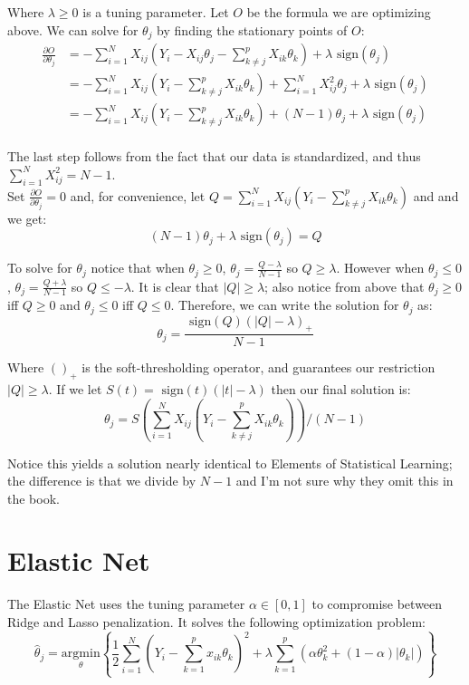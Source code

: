 \documentclass[12pt]{article}
\newcommand{\thh}{\hat{\theta}}
\newcommand{\sgn}{\text{ sign}}
\begin{document}
Where $\lambda \geq 0$ is a tuning parameter.  Let $O$ be the formula we are optimizing above.  We can solve for $\theta_j$ by finding the stationary points of $O$:
\begin{equation}\begin{split}
	\frac{\partial O}{\partial \theta_j}
		& = -\sum\limits_{i=1}^N X_{ij}(Y_i - X_{ij}\theta_j - \sum\limits_{k \ne j}^p X_{ik}\theta_k) + \lambda \sgn(\theta_j) \\
		& = -\sum\limits_{i=1}^N X_{ij}(Y_i - \sum\limits_{k \ne j}^p X_{ik}\theta_k) + \sum\limits_{i=1}^NX_{ij}^2\theta_j + \lambda \sgn(\theta_j) \\
		& = -\sum\limits_{i=1}^N X_{ij}(Y_i - \sum\limits_{k \ne j}^p X_{ik}\theta_k) +(N-1)\theta_j + \lambda \sgn(\theta_j) \\
\end{split}\end{equation}

The last step follows from the fact that our data is standardized, and thus $\sum\limits_{i=1}^NX_{ij}^2 = N-1$.  \\

Set $\frac{\partial O}{\partial \theta_j}=0$ and, for convenience, let $Q = \sum\limits_{i=1}^N X_{ij}(Y_i - \sum\limits_{k \ne j}^p X_{ik}\theta_k)$ and and we get:
	$$(N-1)\theta_j + \lambda\sgn(\theta_j) = Q$$

To solve for $\theta_j$ notice that when $\theta_j \geq 0$, $\theta_j=\frac{Q-\lambda}{N-1}$ so $Q \geq \lambda$.  However when $\theta_j \leq 0$, $\theta_j=\frac{Q+\lambda}{N-1}$ so $Q \leq -\lambda$.  It is clear that $|Q| \geq \lambda$; also notice from above that $\theta_j \geq 0$ iff $Q \geq 0$ and $\theta_j \leq 0$ iff $Q \leq 0$.  Therefore, we can write the solution for $\theta_j$ as:
	$$\theta_j = \frac{\sgn(Q)(|Q|-\lambda)_+}{N-1}$$

Where $()_+$ is the soft-thresholding operator, and guarantees our restriction $|Q| \geq \lambda$.  If we let\cite{ht} $S(t) = \sgn(t)(|t|-\lambda)$ then our final solution is:
	$$\theta_j = S\left(\sum\limits_{i=1}^N X_{ij}(Y_i - \sum\limits_{k \ne j}^p X_{ik}\theta_k)\right)/(N-1)$$

Notice this yields a solution nearly identical to Elements of Statistical Learning\cite{ht}; the difference is that we divide by $N-1$ and I'm not sure why they omit this in the book.  


\section{Elastic Net}
The Elastic Net uses the tuning parameter $\alpha \in [0,1]$ to compromise between Ridge and Lasso penalization.  It solves the following optimization problem:
	$$\thh_j = \underset{\theta}{\text{argmin}}\left\{ \frac{1}{2} \sum\limits_{i=1}^N \left(Y_i - \sum\limits_{k=1}^px_{ik}\theta_k \right)^2 + \lambda \sum\limits_{k=1}^p \left(\alpha\theta_k^2 + (1-\alpha)|\theta_k| \right) \right\}$$
\end{document}
